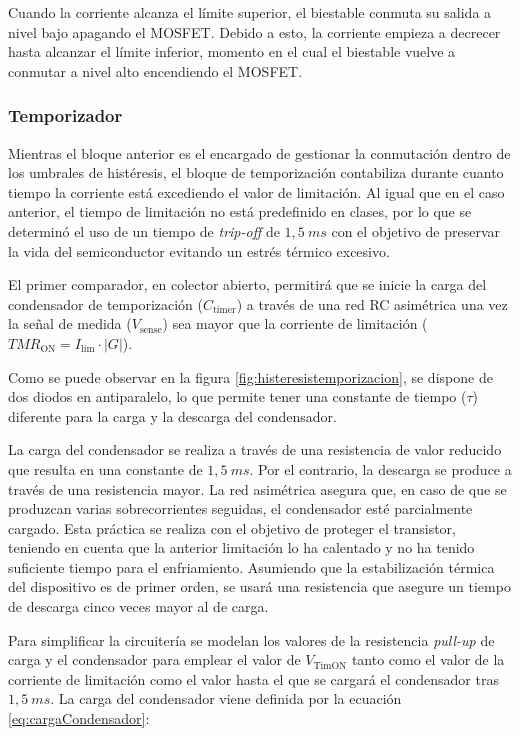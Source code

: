 \documentclass[12pt]{report} %
\begin{document}
Cuando la corriente alcanza el límite superior, el biestable conmuta su salida a nivel bajo apagando el MOSFET. Debido a esto, la corriente empieza a decrecer hasta alcanzar el límite inferior, momento en el cual el biestable vuelve a conmutar a nivel alto encendiendo el MOSFET.

\subsubsection{Temporizador}
\label{subsec:temporizador}
Mientras el bloque anterior es el encargado de gestionar la conmutación dentro de los umbrales de histéresis, el bloque de temporización contabiliza durante cuanto tiempo la corriente está excediendo el valor de limitación. Al igual que en el caso anterior, el tiempo de limitación no está predefinido en clases, por lo que se determinó el uso de un tiempo de \textit{trip-off} de $1{,}5~ms$ con el objetivo de preservar la vida del semiconductor evitando un estrés térmico excesivo. 

El primer comparador, en colector abierto, permitirá que se inicie la carga del condensador de temporización ($C_\text{timer}$) a través de una red RC asimétrica una vez la señal de medida ($V_\text{sense}$) sea mayor que la corriente de limitación ($TMR_\text{ON} = I_\text{lim} \cdot |G|$). 

Como se puede observar en la figura \ref{fig:histeresistemporizacion}, se dispone de dos diodos en antiparalelo, lo que permite tener una constante de tiempo ($\tau$) diferente para la carga y la descarga del condensador.

La carga del condensador se realiza a través de una resistencia de valor reducido que resulta en una constante de $1{,}5~ms$. Por el contrario, la descarga se produce a través de una resistencia mayor. La red asimétrica asegura que, en caso de que se produzcan varias sobrecorrientes seguidas, el condensador esté parcialmente cargado. Esta práctica se realiza con el objetivo de proteger el transistor, teniendo en cuenta que la anterior limitación lo ha calentado y no ha tenido suficiente tiempo para el enfriamiento. Asumiendo que la estabilización térmica del dispositivo es de primer orden, se usará una resistencia que asegure un tiempo de descarga cinco veces mayor al de carga. 

Para simplificar la circuitería se modelan los valores de la resistencia \textit{pull-up} de carga y el condensador para emplear el valor de $V_\text{TimON}$ tanto como el valor de la corriente de limitación como el valor hasta el que se cargará el condensador tras $1{,}5~ms$. La carga del condensador viene definida por la ecuación \ref{eq:cargaCondensador}:
\end{document}
